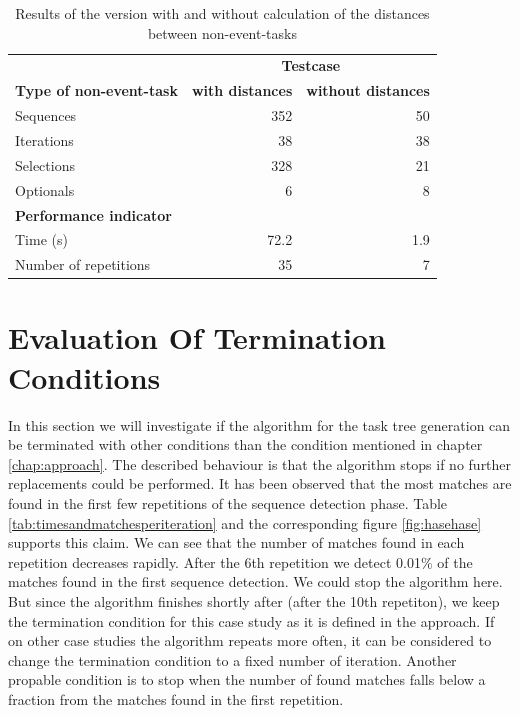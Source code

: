 \begin{table}[h]
	\centering
	\begin{tabular}{l r r}
		\toprule
		&  \multicolumn{2}{c}{\textbf{Testcase}} \\
		\cmidrule{2-3}
		\textbf{Type of non-event-task}& \textbf{with distances}& \textbf{without distances} \\
		\midrule
		Sequences & 352 & 50 \\
		Iterations& 38  & 38 \\
		Selections& 328 & 21 \\
		Optionals & 6   & 8  \\
		\midrule
		\textbf{Performance indicator} & \\
		\midrule
		Time (s)     & 72.2 & 1.9 \\
		Number of repetitions & 35 & 7\\
		\bottomrule
	\end{tabular}
	\caption{Results of the version with and without calculation of the distances between non-event-tasks}
	\label{tab:resultsnoneventtasks}
\end{table}

\section{Evaluation Of Termination Conditions}
In this section we will investigate if the algorithm for the task tree generation can be terminated with other conditions than the condition mentioned in chapter \ref{chap:approach}.
The described behaviour is that the algorithm stops if no further replacements could be performed.
It has been observed that the most matches are found in the first few repetitions of the sequence detection phase.
Table \ref{tab:timesandmatchesperiteration} and the corresponding figure \ref{fig:hasehase} supports this claim. We can see that the number of matches found in each repetition decreases rapidly.
After the 6th repetition we detect 0.01\% of the matches found in the first sequence detection. We could stop the algorithm here. But since the algorithm finishes shortly after (after the 10th repetiton),
we keep the termination condition for this case study as it is defined in the approach.
If on other case studies the algorithm repeats more often, it can be considered to change the termination condition to a fixed number of iteration.
Another propable condition is to stop when the number of found matches falls below a fraction from the matches found in the first repetition.


